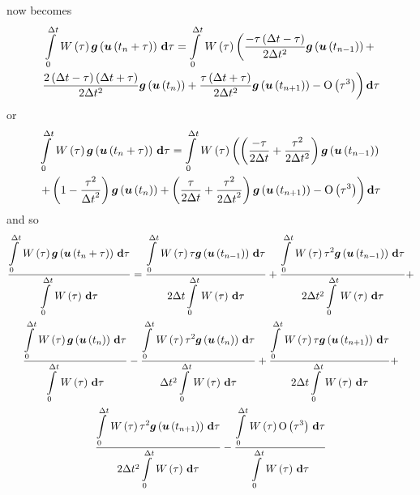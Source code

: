  now becomes
\begin{multline}
  \gint{0}{\Delta
    t}{\fnof{W}{\tau}\fnof{\vectr{g}}{\fnof{\vectr{u}}{t_{n}+\tau}}}{\tau} = 
  \dintl{0}{\Delta t}\,\fnof{W}{\tau}\left(\dfrac{-\tau\pbrac{\Delta t - \tau}}{2\Delta
    t^{2}}\fnof{\vectr{g}}{\fnof{\vectr{u}}{t_{n-1}}}+\right. \\
  \left.\dfrac{2\pbrac{\Delta t - \tau}\pbrac{\Delta t + \tau}}{2\Delta
    t^{2}}\fnof{\vectr{g}}{\fnof{\vectr{u}}{t_{n}}}+
  \dfrac{\tau\pbrac{\Delta t + \tau}}{2\Delta
    t^{2}}\fnof{\vectr{g}}{\fnof{\vectr{u}}{t_{n+1}}}-\orderof{\tau^{3}}\right)\exteriorderivop\tau
\end{multline}
or
\begin{multline}
  \gint{0}{\Delta t}{\fnof{W}{\tau}\fnof{\vectr{g}}{\fnof{\vectr{u}}{t_{n}+\tau}}}{\tau} = 
  \dintl{0}{\Delta t}\,\fnof{W}{\tau}\left(\pbrac{\dfrac{-\tau}{2\Delta t}+\dfrac{\tau^{2}}{2\Delta
      t^{2}}}\fnof{\vectr{g}}{\fnof{\vectr{u}}{t_{n-1}}}\right. \\
  \left.+\pbrac{1-\dfrac{\tau^{2}}{{\Delta t}^{2}}}\fnof{\vectr{g}}{\fnof{\vectr{u}}{t_{n}}}
  +\pbrac{\dfrac{\tau}{2\Delta t}+\dfrac{\tau^{2}}{2{\Delta t}^{2}}}\fnof{\vectr{g}}{\fnof{\vectr{u}}{t_{n+1}}}
    -\orderof{\tau^{3}}\right)\exteriorderivop\tau
\end{multline}
and so 
\begin{multline}
  \dfrac{\gint{0}{\Delta t}{\fnof{W}{\tau}\fnof{\vectr{g}}{\fnof{\vectr{u}}{t_{n}+\tau}}}{\tau}}
        {\gint{0}{\Delta t}{\fnof{W}{\tau}}{\tau}}
        =\dfrac{\gint{0}{\Delta
            t}{\fnof{W}{\tau}\tau\fnof{\vectr{g}}{\fnof{\vectr{u}}{t_{n-1}}}}{\tau}}{2\Delta
          t\gint{0}{\Delta t}{\fnof{W}{\tau}}{\tau}}+ \dfrac{\gint{0}{\Delta
            t}{\fnof{W}{\tau}\tau^{2}\fnof{\vectr{g}}{\fnof{\vectr{u}}{t_{n-1}}}}{\tau}}{2\Delta
          t^{2}\gint{0}{\Delta t}{\fnof{W}{\tau}}{\tau}}+
        \\ \dfrac{\gint{0}{\Delta
            t}{\fnof{W}{\tau}\fnof{\vectr{g}}{\fnof{\vectr{u}}{t_{n}}}}{\tau}}{\gint{0}{\Delta
            t}{\fnof{W}{\tau}}{\tau}}- \dfrac{\gint{0}{\Delta
            t}{\fnof{W}{\tau}\tau^{2}\fnof{\vectr{g}}{\fnof{\vectr{u}}{t_{n}}}}{\tau}}{\Delta
          t^{2}\gint{0}{\Delta t}{\fnof{W}{\tau}}{\tau}}+
        \dfrac{\gint{0}{\Delta
            t}{\fnof{W}{\tau}\tau\fnof{\vectr{g}}{\fnof{\vectr{u}}{t_{n+1}}}}{\tau}}{2\Delta
          t\gint{0}{\Delta t}{\fnof{W}{\tau}}{\tau}}+
        \\ \dfrac{\gint{0}{\Delta
            t}{\fnof{W}{\tau}\tau^{2}\fnof{\vectr{g}}{\fnof{\vectr{u}}{t_{n+1}}}}{\tau}}{2\Delta
          t^{2}\gint{0}{\Delta t}{\fnof{W}{\tau}}{\tau}}-
        \dfrac{\gint{0}{\Delta
            t}{\fnof{W}{\tau}\orderof{\tau^{3}}}{\tau}}{\gint{0}{\Delta
            t}{\fnof{W}{\tau}}{\tau}}
\end{multline}

